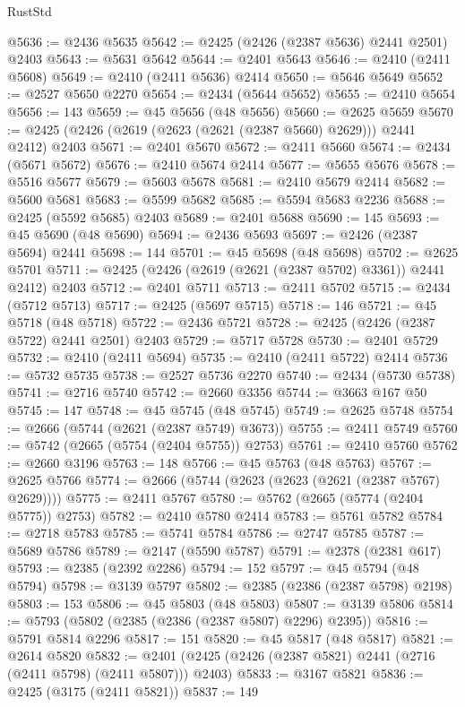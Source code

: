 \begin{lexlean}{RustStd}
\begin{coremodule}
@5636 := @2436 @5635
@5642 := @2425 (@2426 (@2387 @5636) @2441 @2501) @2403
@5643 := @5631 @5642
@5644 := @2401 @5643
@5646 := @2410 (@2411 @5608)
@5649 := @2410 (@2411 @5636) @2414
@5650 := @5646 @5649
@5652 := @2527 @5650 @2270
@5654 := @2434 (@5644 @5652)
@5655 := @2410 @5654
@5656 := 143
@5659 := @45 @5656 (@48 @5656)
@5660 := @2625 @5659
@5670 := @2425 (@2426 (@2619 (@2623 (@2621 (@2387 @5660) @2629))) @2441 @2412) @2403
@5671 := @2401 @5670
@5672 := @2411 @5660
@5674 := @2434 (@5671 @5672)
@5676 := @2410 @5674 @2414
@5677 := @5655 @5676
@5678 := @5516 @5677
@5679 := @5603 @5678
@5681 := @2410 @5679 @2414
@5682 := @5600 @5681
@5683 := @5599 @5682
@5685 := @5594 @5683 @2236
@5688 := @2425 (@5592 @5685) @2403
@5689 := @2401 @5688
@5690 := 145
@5693 := @45 @5690 (@48 @5690)
@5694 := @2436 @5693
@5697 := @2426 (@2387 @5694) @2441
@5698 := 144
@5701 := @45 @5698 (@48 @5698)
@5702 := @2625 @5701
@5711 := @2425 (@2426 (@2619 (@2621 (@2387 @5702) @3361)) @2441 @2412) @2403
@5712 := @2401 @5711
@5713 := @2411 @5702
@5715 := @2434 (@5712 @5713)
@5717 := @2425 (@5697 @5715)
@5718 := 146
@5721 := @45 @5718 (@48 @5718)
@5722 := @2436 @5721
@5728 := @2425 (@2426 (@2387 @5722) @2441 @2501) @2403
@5729 := @5717 @5728
@5730 := @2401 @5729
@5732 := @2410 (@2411 @5694)
@5735 := @2410 (@2411 @5722) @2414
@5736 := @5732 @5735
@5738 := @2527 @5736 @2270
@5740 := @2434 (@5730 @5738)
@5741 := @2716 @5740
@5742 := @2660 @3356
@5744 := @3663 @167 @50
@5745 := 147
@5748 := @45 @5745 (@48 @5745)
@5749 := @2625 @5748
@5754 := @2666 (@5744 (@2621 (@2387 @5749) @3673))
@5755 := @2411 @5749
@5760 := @5742 (@2665 (@5754 (@2404 @5755)) @2753)
@5761 := @2410 @5760
@5762 := @2660 @3196
@5763 := 148
@5766 := @45 @5763 (@48 @5763)
@5767 := @2625 @5766
@5774 := @2666 (@5744 (@2623 (@2623 (@2621 (@2387 @5767) @2629))))
@5775 := @2411 @5767
@5780 := @5762 (@2665 (@5774 (@2404 @5775)) @2753)
@5782 := @2410 @5780 @2414
@5783 := @5761 @5782
@5784 := @2718 @5783
@5785 := @5741 @5784
@5786 := @2747 @5785
@5787 := @5689 @5786
@5789 := @2147 (@5590 @5787)
@5791 := @2378 (@2381 @617)
@5793 := @2385 (@2392 @2286)
@5794 := 152
@5797 := @45 @5794 (@48 @5794)
@5798 := @3139 @5797
@5802 := @2385 (@2386 (@2387 @5798) @2198)
@5803 := 153
@5806 := @45 @5803 (@48 @5803)
@5807 := @3139 @5806
@5814 := @5793 (@5802 (@2385 (@2386 (@2387 @5807) @2296) @2395))
@5816 := @5791 @5814 @2296
@5817 := 151
@5820 := @45 @5817 (@48 @5817)
@5821 := @2614 @5820
@5832 := @2401 (@2425 (@2426 (@2387 @5821) @2441 (@2716 (@2411 @5798) (@2411 @5807))) @2403)
@5833 := @3167 @5821
@5836 := @2425 (@3175 (@2411 @5821))
@5837 := 149

\end{coremodule}
\end{lexlean}
